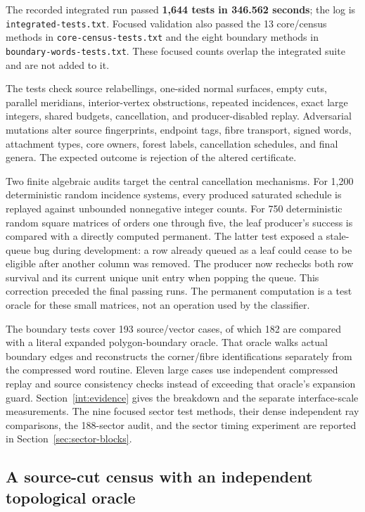 The recorded integrated run passed \textbf{1,644 tests in 346.562 seconds};
the log is \texttt{integrated-tests.txt}.  Focused validation also passed the
13 core/census methods in \texttt{core-census-tests.txt} and the eight boundary
methods in \texttt{boundary-words-tests.txt}.  These focused counts overlap
the integrated suite and are not added to it.

The tests check source relabellings, one-sided normal surfaces, empty cuts,
parallel meridians, interior-vertex obstructions, repeated incidences, exact
large integers, shared budgets, cancellation, and producer-disabled replay.
Adversarial mutations alter source fingerprints, endpoint tags, fibre
transport, signed words, attachment types, core owners, forest labels,
cancellation schedules, and final genera.  The expected outcome is rejection
of the altered certificate.

Two finite algebraic audits target the central cancellation mechanisms.
For 1,200 deterministic random incidence systems, every produced saturated
schedule is replayed against unbounded nonnegative integer counts.  For
750 deterministic random square matrices of orders one through five, the
leaf producer's success is compared with a directly computed permanent.
The latter test exposed a stale-queue bug during development: a row already
queued as a leaf could cease to be eligible after another column was removed.
The producer now rechecks both row survival and its current unique unit
entry when popping the queue.  This correction preceded the final passing
runs.  The permanent computation is a test oracle for these small matrices,
not an operation used by the classifier.

The boundary tests cover 193 source/vector cases, of which 182 are compared
with a literal expanded polygon-boundary oracle.  That oracle walks actual
boundary edges and reconstructs the corner/fibre identifications separately
from the compressed word routine.  Eleven large cases use independent
compressed replay and source consistency checks instead of exceeding that
oracle's expansion guard.  Section~\ref{int:evidence} gives the breakdown and
the separate interface-scale measurements.  The nine focused sector test
methods, their dense independent ray comparisons, the 188-sector audit, and
the sector timing experiment are reported in Section~\ref{sec:sector-blocks}.

\subsection{A source-cut census with an independent topological oracle}
\label{main:exp-census}

